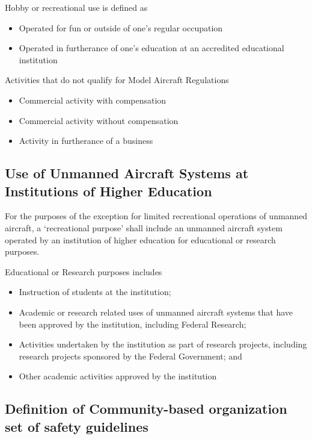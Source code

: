\documentclass[
]{book}
\providecommand{\tightlist}{%
  \setlength{\itemsep}{0pt}\setlength{\parskip}{0pt}}
\begin{document}
Hobby or recreational use is defined as

\begin{itemize}
\tightlist
\item
  Operated for fun or outside of one's regular occupation
\item
  Operated in furtherance of one's education at an accredited educational institution
\end{itemize}

Activities that do not qualify for Model Aircraft Regulations

\begin{itemize}
\tightlist
\item
  Commercial activity with compensation
\item
  Commercial activity without compensation
\item
  Activity in furtherance of a business
\end{itemize}

\hypertarget{use-of-unmanned-aircraft-systems-at-institutions-of-higher-education}{%
\subsection{Use of Unmanned Aircraft Systems at Institutions of Higher Education}\label{use-of-unmanned-aircraft-systems-at-institutions-of-higher-education}}

For the purposes of the exception for limited recreational operations of unmanned aircraft, a `recreational purpose' shall include an unmanned aircraft system operated by an institution of higher education for educational or research purposes.

Educational or Research purposes includes

\begin{itemize}
\tightlist
\item
  Instruction of students at the institution;
\item
  Academic or research related uses of unmanned aircraft systems that have been approved by the institution, including Federal Research;
\item
  Activities undertaken by the institution as part of research projects, including research projects sponsored by the Federal Government; and
\item
  Other academic activities approved by the institution
\end{itemize}

\hypertarget{definition-of-community-based-organization-set-of-safety-guidelines}{%
\subsection{Definition of Community-based organization set of safety guidelines}\label{definition-of-community-based-organization-set-of-safety-guidelines}}
\end{document}
